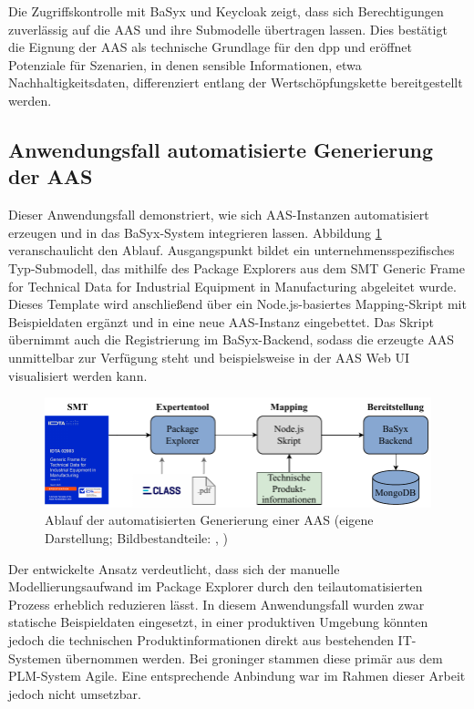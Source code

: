 Die Zugriffskontrolle mit BaSyx und Keycloak zeigt, dass sich Berechtigungen zuverlässig auf die AAS und ihre Submodelle übertragen lassen.
Dies bestätigt die Eignung der AAS als technische Grundlage für den \acs{dpp} und eröffnet Potenziale für Szenarien, in denen sensible Informationen, etwa Nachhaltigkeitsdaten, differenziert entlang der Wertschöpfungskette bereitgestellt werden.

\subsection{Anwendungsfall automatisierte Generierung der AAS}
Dieser Anwendungsfall demonstriert, wie sich AAS-Instanzen automatisiert erzeugen und in das BaSyx-System integrieren lassen.
Abbildung \ref{fig:AutomatisierteGenerierungAblauf} veranschaulicht den Ablauf.
Ausgangspunkt bildet ein unternehmensspezifisches Typ-Submodell, das mithilfe des Package Explorers aus dem SMT Generic Frame for Technical Data for Industrial Equipment in Manufacturing \cite{SpezifikaitonTechnischeDaten} abgeleitet wurde.
Dieses Template wird anschließend über ein Node.js-basiertes Mapping-Skript mit Beispieldaten ergänzt und in eine neue AAS-Instanz eingebettet.
Das Skript übernimmt auch die Registrierung im BaSyx-Backend, sodass die erzeugte AAS unmittelbar zur Verfügung steht und beispielsweise in der AAS Web UI visualisiert werden kann.

\begin{figure}[htbp]
    \centering
        \includegraphics{Bilder/ErgebnisseAutomatisierteGenerierung/ARchitektur.pdf}
    \caption[Ablauf der automatisierten Generierung einer AAS]{Ablauf der automatisierten Generierung einer AAS (eigene Darstellung; Bildbestandteile: \cite{SpezifikaitonTechnischeDaten}, \cite{ECLASSLogo} )}
    \label{fig:AutomatisierteGenerierungAblauf}
\end{figure}

Der entwickelte Ansatz verdeutlicht, dass sich der manuelle Modellierungsaufwand im Package Explorer durch den teilautomatisierten Prozess erheblich reduzieren lässt. 
In diesem Anwendungsfall wurden zwar statische Beispieldaten eingesetzt, in einer produktiven Umgebung könnten jedoch die technischen Produktinformationen direkt aus bestehenden IT-Systemen übernommen werden. 
Bei groninger stammen diese primär aus dem PLM-System Agile. 
Eine entsprechende Anbindung war im Rahmen dieser Arbeit jedoch nicht umsetzbar.


